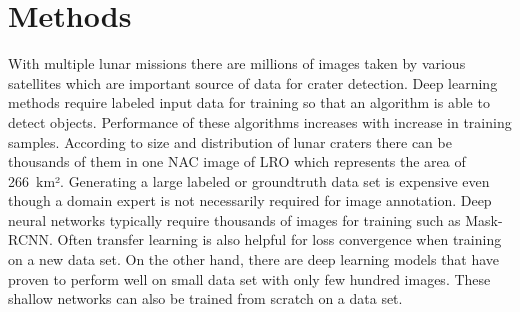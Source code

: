 \documentclass[11pt]{article}
\begin{document}




\section{Methods}
With multiple lunar missions there are millions of images taken by various satellites which are important source of data for crater detection. Deep learning methods require labeled input data for training so that an algorithm is able to detect objects. Performance of these algorithms increases with increase in training samples. According to size and distribution of lunar craters there can be thousands of them in one NAC image of LRO which represents the area of \SI{266}{km}². Generating a large labeled or groundtruth data set is expensive even though a domain expert is not necessarily required for image annotation. Deep neural networks typically require thousands of images for training such as Mask-RCNN. Often transfer learning is also helpful for loss convergence when training on a new data set. On the other hand, there are deep learning models that have proven to perform well on small data set with only few hundred images. These shallow networks can also be trained from scratch on a data set.
\end{document}

